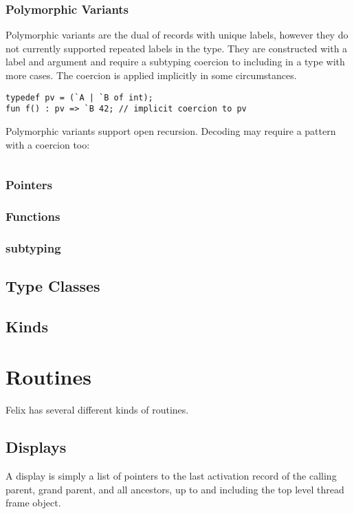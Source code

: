 \documentclass[oneside]{book}
\begin{document}
\subsection{Polymorphic Variants}
Polymorphic variants are the dual of records with unique labels,
however they do not currently supported repeated labels in the type.
They are constructed with a label and argument and require a subtyping
coercion to including in a type with more cases. The coercion is applied
implicitly in some circumstances.
\begin{verbatim}
typedef pv = (`A | `B of int);
fun f() : pv => `B 42; // implicit coercion to pv
\end{verbatim}
Polymorphic variants support open recursion.
Decoding may require a pattern with a coercion too:
\begin{verbatim}
\end{verbatim}


\subsection{Pointers}
\subsection{Functions}
\subsection{subtyping}

\section{Type Classes}
\section{Kinds}

\chapter{Routines}
Felix has several different kinds of routines.

\section{Displays}
A display is simply a list of pointers to the last activation record of 
the calling parent, grand parent, and all ancestors, up to and including
the top level thread frame object.
\end{document}
